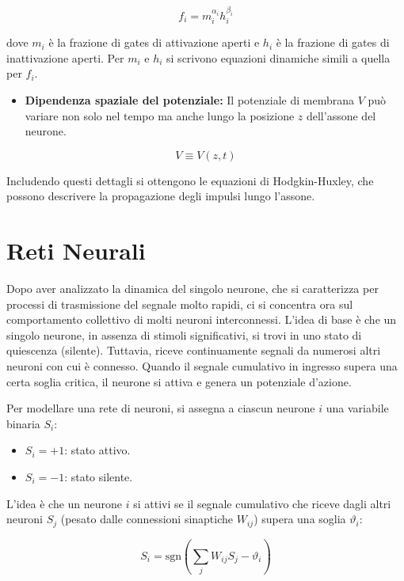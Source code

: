\begin{equation} \label{eq:ch21_11}
f_i = m_i^{\alpha_i} h_i^{\beta_i}
\end{equation}

dove $m_i$ è la frazione di gates di attivazione aperti e $h_i$ è la frazione di gates di inattivazione aperti. Per $m_i$ e $h_i$ si scrivono equazioni dinamiche simili a quella per $f_i$.

\begin{itemize}
    \item \textbf{Dipendenza spaziale del potenziale:} Il potenziale di membrana $V$ può variare non solo nel tempo ma anche lungo la posizione $z$ dell'assone del neurone.
\end{itemize}

\begin{equation} \label{eq:ch21_12}
V \equiv V(z,t)
\end{equation}

Includendo questi dettagli si ottengono le equazioni di Hodgkin-Huxley, che possono descrivere la propagazione degli impulsi lungo l'assone.


\section{Reti Neurali}
Dopo aver analizzato la dinamica del singolo neurone, che si caratterizza per processi di trasmissione del segnale molto rapidi, ci si concentra ora sul comportamento collettivo di molti neuroni interconnessi. L'idea di base è che un singolo neurone, in assenza di stimoli significativi, si trovi in uno stato di quiescenza (silente). Tuttavia, riceve continuamente segnali da numerosi altri neuroni con cui è connesso. Quando il segnale cumulativo in ingresso supera una certa soglia critica, il neurone si attiva e genera un potenziale d'azione.

Per modellare una rete di neuroni, si assegna a ciascun neurone $i$ una variabile binaria $S_i$:
\begin{itemize}
    \item $S_i = +1$: stato attivo.
    \item $S_i = -1$: stato silente.
\end{itemize}

L'idea è che un neurone $i$ si attivi se il segnale cumulativo che riceve dagli altri neuroni $S_j$ (pesato dalle connessioni sinaptiche $W_{ij}$) supera una soglia $\vartheta_i$:

\begin{equation} \label{eq:ch21_13}
S_i= \text{sgn}\left(\sum_j W_{ij}S_j- \vartheta_i\right)
\end{equation}

